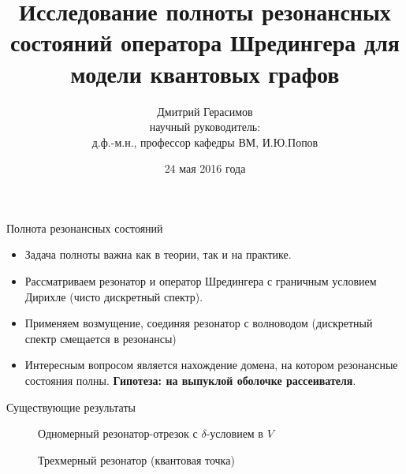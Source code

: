 \documentclass{beamer}
\title[]{Исследование полноты резонансных состояний оператора Шредингера
для модели квантовых графов}
\author[Дмитрий Герасимов]{Дмитрий Герасимов\\{\small научный руководитель: \\ д.ф.-м.н., профессор кафедры ВМ, И.Ю.Попов}}
\institute[ИТМО]{Университет ИТМО}
\date{24 мая 2016 года}
\begin{document}
\maketitle

\begin{frame}{Полнота резонансных состояний}

\begin{itemize}
\item Задача полноты важна как в теории, так и на практике.

\item Рассматриваем резонатор и оператор Шредингера с граничным условием Дирихле (чисто дискретный спектр).

\item Применяем возмущение, соединяя резонатор с волноводом (дискретный спектр смещается в резонансы)

\item Интересным вопросом является нахождение домена, на котором резонансные состояния полны. \textbf{Гипотеза: на выпуклой оболочке рассеивателя}.
\end{itemize}
% 



\end{frame}



\begin{frame}{Существующие результаты}
\begin{figure}
\begin{tikzpicture}[scale=0.5]

\end{tikzpicture}
\caption{Одномерный резонатор-отрезок с $\delta$-условием в $V$}
\end{figure}

\begin{figure}
\begin{tikzpicture}[scale=0.5]

\end{tikzpicture}
\caption{Трехмерный резонатор (квантовая точка)}
\end{figure}
\end{frame}
\end{document}
